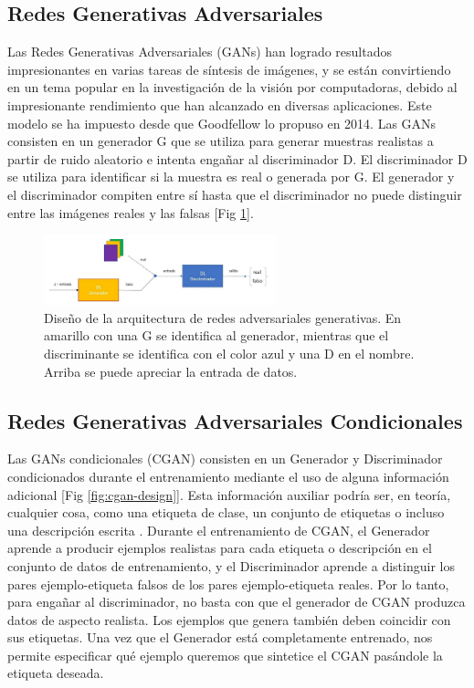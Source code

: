 \subsection{Redes Generativas Adversariales}

Las Redes Generativas Adversariales (GANs) han logrado resultados impresionantes en varias tareas de síntesis de imágenes, y se están convirtiendo en un tema popular en la investigación de la visión por computadoras, debido al impresionante rendimiento que han alcanzado en diversas aplicaciones. Este modelo se ha impuesto desde que Goodfellow lo propuso en 2014.
Las GANs consisten en un generador G que se utiliza para generar muestras realistas a partir de ruido aleatorio e intenta engañar al discriminador D. El discriminador D se utiliza para identificar si la muestra es real o generada por G. El generador y el discriminador compiten entre sí hasta que el discriminador no puede distinguir entre las imágenes reales y las falsas [Fig \ref{fig:gan-design}].

\begin{figure}[ht!]
    \centering
    \includegraphics[width=0.6\textwidth]{Graphics/gan-design.png}
    \caption{Diseño de la arquitectura de redes adversariales generativas. En amarillo con una G se identifica al generador, mientras que el discriminante se identifica con el color azul y una D en el nombre. Arriba se puede apreciar la entrada de datos.}
    \label{fig:gan-design}
\end{figure}

\subsection{Redes Generativas Adversariales Condicionales}
Las GANs condicionales (CGAN) consisten en un Generador y Discriminador condicionados durante el entrenamiento mediante el uso de alguna información adicional [Fig \ref{fig:cgan-design}]. Esta información auxiliar podría ser, en teoría, cualquier cosa, como una etiqueta de clase, un conjunto de etiquetas o incluso una descripción escrita . 
Durante el entrenamiento de CGAN, el Generador aprende a producir ejemplos realistas para cada etiqueta o descripción en el conjunto de datos de entrenamiento, y el Discriminador aprende a distinguir los pares ejemplo-etiqueta falsos de los pares ejemplo-etiqueta reales. 
Por lo tanto, para engañar al discriminador, no basta con que el generador de CGAN produzca datos de aspecto realista. Los ejemplos que genera también deben coincidir con sus etiquetas. Una vez que el Generador está completamente entrenado, nos permite especificar qué ejemplo queremos que sintetice el CGAN pasándole la etiqueta deseada.

